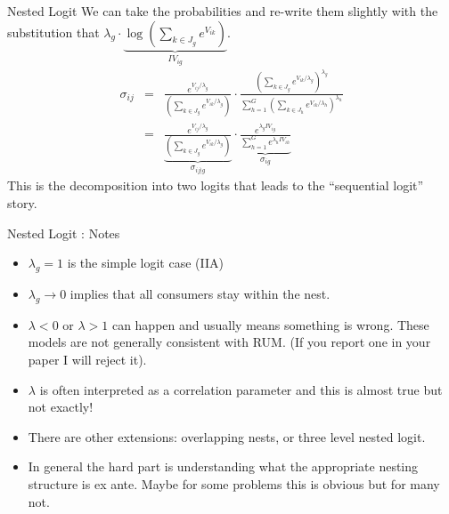 \documentclass[aspectratio=169,11pt]{beamer}
\begin{document}
\begin{frame}{Nested Logit}
We can take the probabilities and re-write them slightly with the substitution that 
$\lambda_g \cdot \underbrace{\log \left(\sum_{k \in J_g} e^{V_{ik}} \right)}_{IV_{ig}}$.
\begin{eqnarray*}
\sigma_{ij} &=& \frac{ e^{V_{ij}/\lambda_g}}{ \left(\sum_{k \in J_g} e^{V_{ik}/\lambda_g} \right)}
\cdot
\frac{ \left(\sum_{k \in J_g} e^{V_{ik}/\lambda_g} \right)^{\lambda_g}}{\sum_{h=1}^G \left(\sum_{k \in J_h} e^{V_{ik}/\lambda_h} \right)^{\lambda_h}} \\
&=& \underbrace{\frac{ e^{V_{ij}/\lambda_g}}{ \left(\sum_{k \in J_g} e^{V_{ik}/\lambda_g} \right)}}_{\sigma_{ij|g}}
\cdot
\underbrace{\frac{e^{\lambda_g IV_{ig}}}{\sum_{h=1}^{G} e^{\lambda_h IV_{ih}} }}_{\sigma_{ig}}
\end{eqnarray*}
This is the decomposition into two logits that leads to the ``sequential logit'' story.
\end{frame}

\begin{frame}{Nested Logit : Notes}
\begin{itemize}
\item $\lambda_g=1$ is the simple logit case (IIA)
\item $\lambda_g \rightarrow 0$ implies that all consumers stay within the nest.
\item $\lambda < 0$ or $\lambda > 1$ can happen and usually means something is wrong. These models are not generally consistent with RUM. (If you report one in your paper I will reject it).
\item $\lambda$ is often interpreted as a correlation parameter and this is almost true but not exactly!
\item There are other extensions: overlapping nests, or three level nested logit. 
\item In general the hard part is understanding what the appropriate nesting structure is ex ante. Maybe for some problems this is obvious but for many not.
\end{itemize}
\end{frame}

\end{document}
